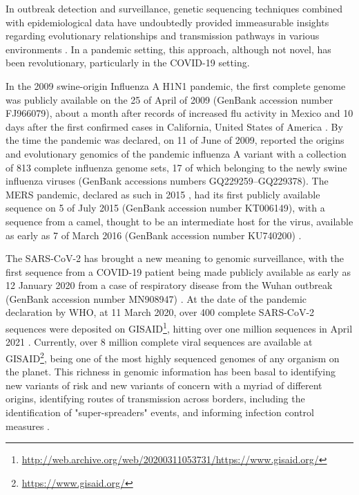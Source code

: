 In outbreak detection and surveillance, genetic sequencing techniques combined with epidemiological data have undoubtedly provided immeasurable insights regarding evolutionary relationships and transmission pathways in various environments \citep{beckett_pandemic_2021, lancet_genomic_2021}. 
In a pandemic setting, this approach, although not novel, has been revolutionary, particularly in the COVID-19 setting. 

In the 2009 swine-origin Influenza A H1N1 pandemic, the first complete genome was publicly available on the 25 of April of 2009 (GenBank accession number FJ966079), about a month after records of increased flu activity in Mexico and 10 days after the first confirmed cases in California, United States of America \citep{smith_origins_2009, novel_swine-origin_influenza_a_h1n1_virus_investigation_team_emergence_2009}. 
By the time the pandemic was declared, on 11 of June of 2009, \cite{smith_origins_2009} reported the origins and evolutionary genomics of the pandemic influenza A variant with a collection of 813 complete influenza genome sets, 17 of which belonging to the newly swine influenza viruses (GenBank accessions numbers GQ229259–GQ229378). 
The \ac{MERS} pandemic, declared as such in 2015 \citep{piret_pandemics_2021}, had its first publicly available sequence on 5 of July 2015 (GenBank accession number KT006149)\citep{lu_complete_2015}, with a sequence from a camel, thought to be an intermediate host for the virus, available as early as 7 of March 2016 (GenBank accession number KU740200) \citep{kandeil_complete_2016, al-shomrani_genomic_2020}. 

The \ac{SARS-CoV-2} has brought a new meaning to genomic surveillance, with the first sequence from a COVID-19 patient being made publicly available as early as 12 January 2020 from a case of respiratory disease from the Wuhan outbreak (GenBank accession number MN908947) \citep{wu_new_2020}. 
At the date of the pandemic declaration by WHO, at 11 March 2020, over 400 complete \ac{SARS-CoV-2} sequences were deposited on GISAID\footnote{\url{http://web.archive.org/web/20200311053731/https://www.gisaid.org/}}, hitting over one million sequences in April 2021 \citep{maxmen_one_2021}. 
Currently, over 8 million complete viral sequences are available at GISAID\footnote{\url{https://www.gisaid.org/}}, being one of the most highly sequenced genomes of any organism on the planet. 
This richness in genomic information has been basal to identifying new variants of risk and new variants of concern with a myriad of different origins, identifying routes of transmission across borders, including the identification of "super-spreaders" events, and informing infection control measures \citep{lancet_genomic_2021, beckett_pandemic_2021, borges_sars-cov-2_2022}.  

